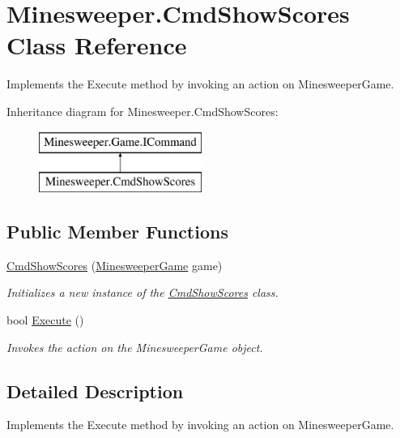 \hypertarget{class_minesweeper_1_1_cmd_show_scores}{\section{Minesweeper.\+Cmd\+Show\+Scores Class Reference}
\label{class_minesweeper_1_1_cmd_show_scores}
}


Implements the Execute method by invoking an action on Minesweeper\+Game.  


Inheritance diagram for Minesweeper.\+Cmd\+Show\+Scores\+:\begin{figure}[H]
\begin{center}
\leavevmode
\includegraphics[height=2.000000cm]{class_minesweeper_1_1_cmd_show_scores}
\end{center}
\end{figure}
\subsection*{Public Member Functions}
\begin{DoxyCompactItemize}
\item 
\hyperlink{class_minesweeper_1_1_cmd_show_scores_a00083f6a898ba5324df364c3f38deef4}{Cmd\+Show\+Scores} (\hyperlink{class_minesweeper_1_1_game_1_1_minesweeper_game}{Minesweeper\+Game} game)
\begin{DoxyCompactList}\small\item\em Initializes a new instance of the \hyperlink{class_minesweeper_1_1_cmd_show_scores}{Cmd\+Show\+Scores} class. \end{DoxyCompactList}\item 
bool \hyperlink{class_minesweeper_1_1_cmd_show_scores_ab704f1d09e8802999384c6af9d8d807b}{Execute} ()
\begin{DoxyCompactList}\small\item\em Invokes the action on the Minesweeper\+Game object. \end{DoxyCompactList}\end{DoxyCompactItemize}


\subsection{Detailed Description}
Implements the Execute method by invoking an action on Minesweeper\+Game. 



